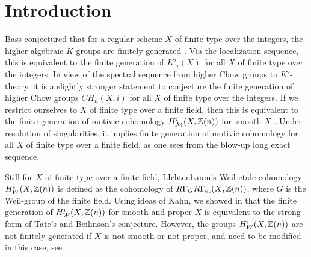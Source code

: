 \documentclass[nospthms,envcountsect]{svmult} %
\begin{document}
\maketitle

\vskip-1.5cm

\begin{abstract}
We relate motivic cohomology, and Weil-etale cohomology, both
of which are finitely generated, by an intermediate cohomology 
theory, which we also conjecture to be finitely generated, and
examine the relationship of the three theories.
\end{abstract}

\section{Introduction}
Bass conjectured that for a regular scheme $X$ of finite type
over the integers, the higher algebraic $K$-groups are finitely
generated \cite{bassln342}. 
Via the localization sequence, this is equivalent to 
the finite generation of $K'_i(X)$ for all $X$ of finite type
over the integers. In view of the spectral sequence from 
higher Chow groups to $K'$-theory, it is a slightly stronger
statement to conjecture the finite generation of higher Chow groups 
$CH_n(X,i)$ for all $X$ of finite type over the integers.
If we restrict ourselves to $X$ of finite type over a finite field,
then this is equivalent to the finite generation of 
motivic cohomology $H^i_{\mathcal M}(X,{{\mathbb Z}}(n))$ for smooth $X$
\cite{voevodsky}. Under resolution of singularities, it implies
finite generation of motivic cohomology for all $X$ of finite
type over a finite field, as one sees 
from the blow-up long exact sequence. 

Still for $X$ of finite type over a finite field, LIchtenbaum's 
Weil-etale cohomology $H^i_W(X,{{\mathbb Z}}(n))$ is defined as the 
cohomology of $R\Gamma_GR\Gamma_{\text{\rm et}}(\bar X,{{\mathbb Z}}(n))$, where $G$
is the Weil-group of the finite field. Using ideas of Kahn, we showed in \cite{ichweilI} 
that the finite generation of $H^i_W(X,{{\mathbb Z}}(n))$ for smooth
and proper $X$ is equivalent to the strong form of Tate's and 
Beilinson's conjecture. However, the groups 
$H^i_W(X,{{\mathbb Z}}(n))$ are not finitely generated if $X$ is not
smooth or not proper, and need to be modified in this case,
see \cite{ichweilII}.
\end{document}
